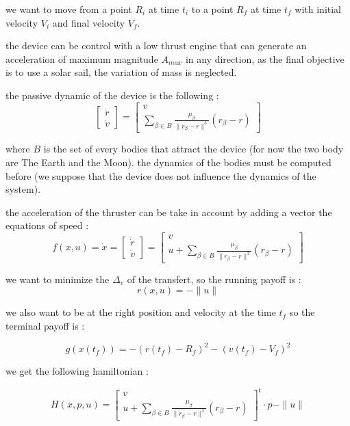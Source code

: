 \documentclass{article} %
\begin{document}
			we want to move from a point $R_i$ at time $t_i$ to a point $R_f$ at time $t_f$ with initial velocity $V_i$ and final velocity $V_f$.
			
			the device can be control with a low thrust engine that can generate an acceleration of maximum magnitude $A_{max}$ in any direction, as the final objective is to use a solar sail, the variation of mass is neglected.
			
			the passive dynamic of the device is the following : 
			$$
			\begin{bmatrix}
				\dot{r}\\
				\dot{v}
			\end{bmatrix} =\begin{bmatrix}
				v\\
				\sum\limits _{\beta \in B }\frac{\mu _{\beta }}{\| r_{\beta } -r\| ^{3}}( r_{\beta } -r)
			\end{bmatrix}
			$$
			
			where $B$ is the set of every bodies that attract the device (for now the two body are The Earth and the Moon). the dynamics of the bodies must be computed before (we suppose that the device does not influence the dynamics of the system).
			
			the acceleration of the thruster can be take in account by adding a vector the equations of speed : \\
			
			$$
			f(x,u)=\dot{x}=
			\begin{bmatrix}
				\dot{r}\\
				\dot{v}
			\end{bmatrix}
			=\begin{bmatrix}
				v\\
				u+\sum\limits _{\beta \in B }\frac{\mu _{\beta }}{\| r_{\beta } -r\| ^{3}}( r_{\beta } -r)
			\end{bmatrix}
			$$
			
			we want to minimize the $\Delta_v$ of the transfert, so the running payoff is :
			$$
			r(x,u)=-\|u\|
			$$ 
			
			we also want to be at the right position and velocity at the time $t_f$ so the terminal payoff is :
			
			$$
			g(x(t_f))=-(r(t_f)-R_f)^2-(v(t_f)-V_f)^2
			$$
			
			we get the following hamiltonian :
			
			$$
			H(x,p,u)=\begin{bmatrix}
				v\\
				u+\sum\limits _{\beta \in B }\frac{\mu _{\beta }}{\| r_{\beta } -r\| ^{3}}( r_{\beta } -r)
			\end{bmatrix}^t\cdot p-\|u\|
			$$
			
\end{document}
